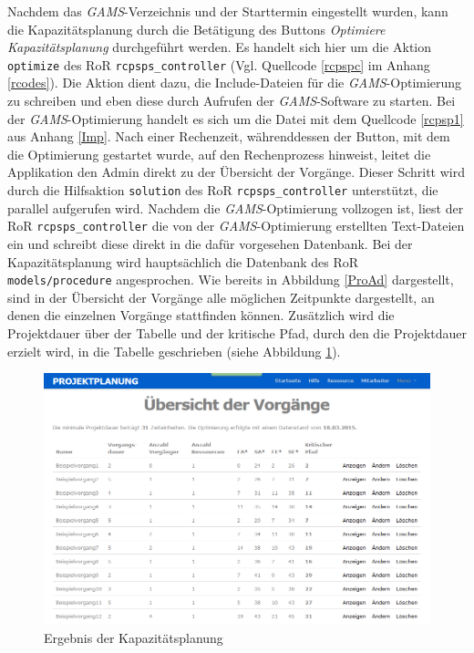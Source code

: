 \documentclass[a4paper,12pt,parskip,bibtotoc,liststotoc]{article}
\begin{document}
Nachdem das \textit{GAMS}-Verzeichnis und der Starttermin eingestellt wurden, kann die Kapazitätsplanung durch die Betätigung des Buttons \textit{Optimiere Kapazitätsplanung} durchgeführt werden. Es handelt sich hier um die Aktion \texttt{optimize} des RoR \texttt{rcpsps\_controller} (Vgl. Quellcode \ref{rcpspc} im Anhang \ref{rcodes}). Die Aktion dient dazu, die Include-Dateien für die \textit{GAMS}-Optimierung zu schreiben und eben diese durch Aufrufen der \textit{GAMS}-Software zu starten. Bei der \textit{GAMS}-Optimierung handelt es sich um die Datei mit dem Quellcode \ref{rcpsp1} aus Anhang \ref{Imp}. Nach einer Rechenzeit, währenddessen der Button, mit dem die Optimierung gestartet wurde, auf den Rechenprozess hinweist, leitet die Applikation den Admin direkt zu der Übersicht der Vorgänge. Dieser Schritt wird durch die Hilfsaktion \texttt{solution} des RoR \texttt{rcpsps\_controller} unterstützt, die parallel aufgerufen wird. Nachdem die \textit{GAMS}-Optimierung vollzogen ist, liest der RoR \texttt{rcpsps\_controller} die von der \textit{GAMS}-Optimierung erstellten Text-Dateien ein und schreibt diese direkt in die dafür vorgesehen Datenbank. Bei der Kapazitätsplanung wird hauptsächlich die Datenbank des RoR \texttt{models/procedure} angesprochen. Wie bereits in Abbildung \ref{ProAd} dargestellt, sind in der Übersicht der Vorgänge alle möglichen Zeitpunkte dargestellt, an denen die einzelnen Vorgänge stattfinden können. Zusätzlich wird die Projektdauer über der Tabelle und der kritische Pfad, durch den die Projektdauer erzielt wird, in die Tabelle geschrieben (siehe Abbildung \ref{Kap}).\\
\begin{figure}[h!]
  \begin{center}
    \includegraphics[width=120mm]{Bilder/Kapazitaetsplanung.png}
    \caption{Ergebnis der Kapazitätsplanung}  \label{Kap}
  \end{center}
\end{figure}
\end{document}
